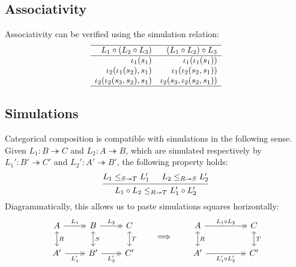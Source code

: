 \documentclass{article}
\begin{document}

\subsection{Associativity} %

Associativity can be verified using
the simulation relation:
\[
  \begin{array}{rr}
    \hline
    L_1 \circ (L_2 \circ L_3) & (L_1 \circ L_2) \circ L_3 \\
    \hline
    \iota_1(s_1) & \iota_1(\iota_1(s_1)) \\
    \iota_2(\iota_1(s_2), s_1) & \iota_1(\iota_2(s_2, s_1)) \\
    \iota_2(\iota_2(s_3, s_2), s_1) & \iota_2(s_3, \iota_2(s_2, s_1)) \\
    \hline
  \end{array}
\]


\subsection{Simulations} %

Categorical composition is compatible with simulations in the following sense.
Given
$L_1 : B \twoheadrightarrow C$ and $L_2 : A \twoheadrightarrow B$,
which are simulated respectively by
$L_1' : B' \twoheadrightarrow C'$ and $L_2' : A' \twoheadrightarrow B'$,
the following property holds:
\[
  \begin{prooftree}
    \hypo{L_1 \le_{S \twoheadrightarrow T} L_1'}
    \hypo{L_2 \le_{R \twoheadrightarrow S} L_2'}
    \infer2{L_1 \circ L_2 \le_{R \twoheadrightarrow T} L_1' \circ L_2'}
  \end{prooftree}
\]
Diagrammatically,
this allows us to paste simulations squares horizontally:
\[
  \begin{tikzcd}
    A \ar[r, ->>, "L_1"] \ar[d, <->, "R"] &
    B \ar[r, ->>, "L_2"] \ar[d, <->, "S"] &
    C \ar[d, <->, "T"] \\
    A' \ar[r, ->>, "L_1'"'] &
    B' \ar[r, ->>, "L_2'"'] &
    C'
  \end{tikzcd}
  \qquad \Longrightarrow \qquad
  \begin{tikzcd}
    A \ar[rr, ->>, "L_1 \circ L_2"] \ar[d, <->, "R"] &&
    C \ar[d, <->, "T"] \\
    A' \ar[rr, ->>, "L_1' \circ L_2'"'] &&
    C'
  \end{tikzcd}
\]
\end{document}
